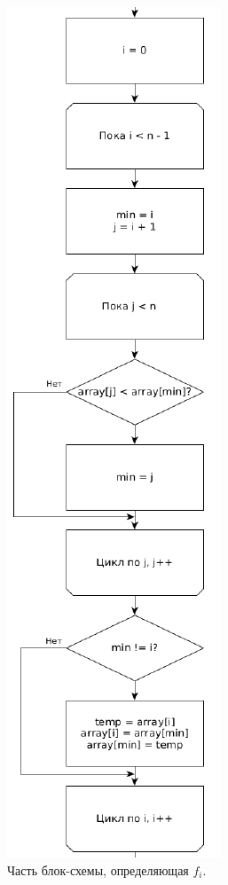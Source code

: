 \documentclass[12pt]{report}
\begin{document}
\begin{figure}
\begin{center}
\includegraphics[scale=0.7]{inc/img/selectionfi.png}
\captionsetup{justification=centering}
	\caption{Часть блок-схемы, определяющая $f_{i}$.}
	\label{img:selection:fi}	
\end{center}
\end{figure}
\newpage 
\end{document}
